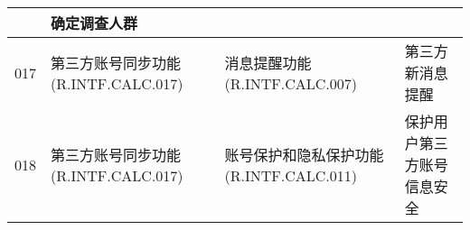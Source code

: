 \begin{table}[htbp]
\begin{tabular}{|p{6em}|p{9em}|p{9em}|p{7em}|}
            &   \color{red}确定调查人群\\
            \hline%
                \color{red}017 
            &   \color{red}第三方账号同步功能(R.INTF.CALC.017)            
            &   \color{red}消息提醒功能(R.INTF.CALC.007)                             
            &   \color{red}第三方新消息提醒\\
            \hline%
                \color{red}018        
            &   \color{red}第三方账号同步功能(R.INTF.CALC.017)            
            &   \color{red}账号保护和隐私保护功能(R.INTF.CALC.011)                             
            &   \color{red}保护用户第三方账号信息安全\\
            \hline%
    \end{tabular}
\end{table}